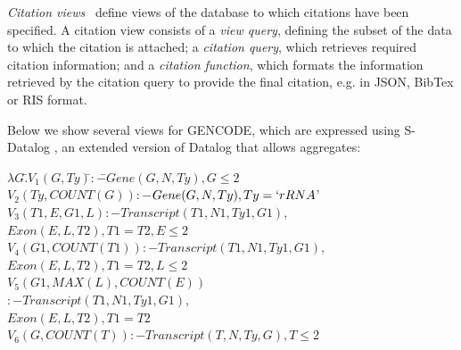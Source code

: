 \textit{Citation views}~\cite{davidson2017model} define views of the database to which citations have been specified.  A citation view consists of a \textit{view query}, defining the subset of the data to which the citation is attached; a \textit{citation query}, which retrieves required citation information; and a \textit{citation function}, which formats the information retrieved by the citation query to provide the final citation, e.g. in JSON, BibTex or RIS format. %

Below we show several views for GENCODE, which are expressed using S-Datalog \cite{consens1990low}, an extended version of Datalog that allows aggregates:
\noindent
\begin{tabbing}
$\lambda G.$\=$V_1(G, Ty) $\hspace{5.3em}\=$:-$\=$ Gene(G, N, Ty), G \leq 2$\\
\>$V_2(Ty, COUNT(G)) $\>$:-$\>$ Gene(G, N, Ty), Ty = `rRNA$'\\
\>$V_3(T1, E, G1, L)$\>$:-$\>$Transcript(T1, N1, Ty1, G1),$\\
\>\>$Exon(E, L, T2), T1 = T2,E \leq 2$\\
\> $V_4(G1, COUNT(T1))$\>$:-$\>$Transcript(T1, N1, Ty1, G1),$\\
\>\>$Exon(E, L, T2), T1 = T2, L \leq 2$\\
\>$V_5(G1, MAX(L), COUNT(E))$\\
\>\>$:-$\>$Transcript(T1, N1, Ty1, G1),$\\
\>\>$Exon(E, L, T2), T1 = T2$\\
\> $V_6(G, COUNT(T)) $\>$:-$\>$ Transcript(T, N, Ty, G), T \leq 2$
\end{tabbing}
